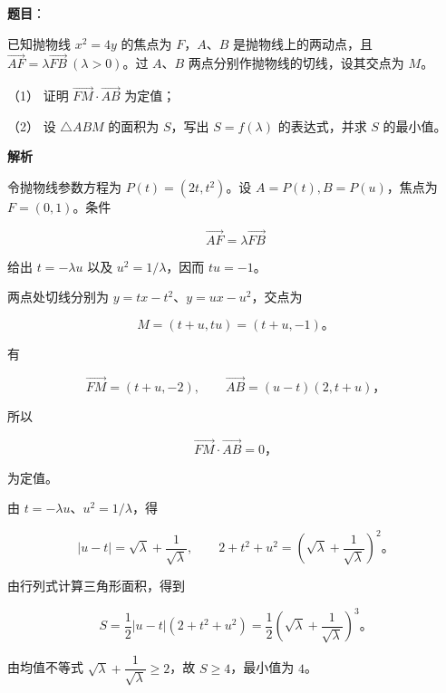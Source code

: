 \begin{answer}

\textbf{题目}：

已知抛物线 $x^2=4y$ 的焦点为 $F$，$A\text{、}B$ 是抛物线上的两动点，且 $\overrightarrow{AF}=\lambda\overrightarrow{FB}\ (\lambda>0)$。过 $A\text{、}B$ 两点分别作抛物线的切线，设其交点为 $M$。
\nopagebreak[4]
\begin{center}\end{center}
\nopagebreak[4]
（1） 证明 $\overrightarrow{FM}\cdot\overrightarrow{AB}$ 为定值；

（2） 设 $\triangle ABM$ 的面积为 $S$，写出 $S=f(\lambda)$ 的表达式，并求 $S$ 的最小值。

\textbf{解析}

令抛物线参数方程为 $P(t)=(2t,t^2)$。设 $A=P(t),B=P(u)$，焦点为 $F=(0,1)$。条件

\nopagebreak[4]
\[
\overrightarrow{AF}=\lambda\overrightarrow{FB}
\]

给出 $t=-\lambda u$ 以及 $u^2=1/\lambda$，因而 $tu=-1$。

两点处切线分别为 $y=tx-t^2$、$y=ux-u^2$，交点为

\nopagebreak[4]
\[
M=(t+u,tu)=(t+u,-1)\text{。}
\]


有

\nopagebreak[4]
\[
\overrightarrow{FM}=(t+u,-2),\qquad
\overrightarrow{AB}=(u-t)(2,t+u)\text{，}
\]

所以

\nopagebreak[4]
\[
\overrightarrow{FM}\cdot\overrightarrow{AB}=0\text{，}
\]

为定值。


由 $t=-\lambda u$、$u^2=1/\lambda$，得

\nopagebreak[4]
\[
|u-t|=\sqrt\lambda+\frac1{\sqrt\lambda},\qquad
2+t^2+u^2=\left(\sqrt\lambda+\frac1{\sqrt\lambda}\right)^2\text{。}
\]

由行列式计算三角形面积，得到

\nopagebreak[4]
\[
S=\frac12|u-t|(2+t^2+u^2)
=\frac12\left(\sqrt\lambda+\frac1{\sqrt\lambda}\right)^3\text{。}
\]

由均值不等式 $\sqrt\lambda+\dfrac1{\sqrt\lambda}\geqslant2$，故 $S\geqslant4$，最小值为 $4$。



\end{answer}